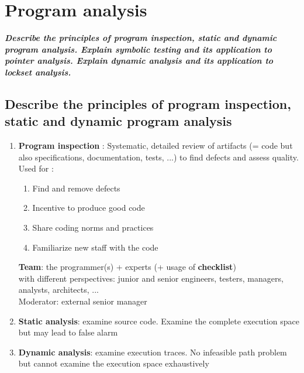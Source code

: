 \documentclass{article}
\begin{document}
\newpage
\section{Program analysis}
\textbf{\textit{Describe the principles of program inspection, static and dynamic program analysis. Explain symbolic testing and its application to pointer analysis. Explain dynamic analysis and its application to lockset analysis.}}

\subsection{Describe the principles of program inspection, static and dynamic program analysis}
\begin{enumerate}
    \item \textbf{Program inspection} : Systematic,
detailed review of
artifacts (= code
but
also specifications,
documentation,
tests,
...)
to 
find defects and
assess quality.\\ 
Used for : 
\begin{enumerate}
    \item Find and
remove defects
    \item Incentive to
produce good
code
    \item Share
coding norms and
practices
    \item Familiarize new
staff
with the
code\\
\end{enumerate}

\noindent \textbf{Team}:
the
programmer(s)
+
experts (+ usage of \textbf{checklist})\\
with
different
perspectives:
junior
and
senior
engineers,
testers,
managers,
analysts,
architects,
...\\
Moderator:
external
senior
manager
\\
    \item \textbf{Static analysis}: examine source code. Examine the complete execution space but may lead to false
alarm
    \item \textbf{Dynamic analysis}: examine execution traces. No infeasible path problem but cannot examine the
execution space exhaustively
\end{enumerate}
\end{document}
